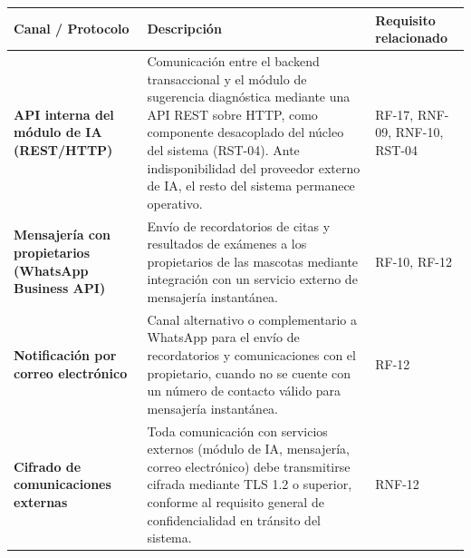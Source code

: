 \documentclass[
]{article}
\newcounter{none} %
\begin{document}
{\def\LTcaptype{none} %
\begin{longtable}[]{|
  >{\raggedright\arraybackslash}p{}|
  >{\raggedright\arraybackslash}p{}|
  >{\raggedright\arraybackslash}p{}|}
\hline
\begin{minipage}[b]{\linewidth}\raggedright
\textbf{Canal / Protocolo}
\end{minipage} & \begin{minipage}[b]{\linewidth}\raggedright
\textbf{Descripción}
\end{minipage} & \begin{minipage}[b]{\linewidth}\raggedright
\textbf{Requisito relacionado}
\end{minipage} \\
\hline
\endhead
\hline
\endlastfoot
\textbf{API interna del módulo de IA (REST/HTTP)} &
\begin{minipage}[t]{\linewidth}\raggedright
Comunicación entre el backend transaccional y el módulo de sugerencia
diagnóstica mediante una API REST sobre HTTP, como componente
desacoplado del núcleo del sistema (RST-04). Ante indisponibilidad del
proveedor externo de IA, el resto del sistema permanece operativo.
\end{minipage} & RF-17, RNF-09, RNF-10, RST-04 \\
\hline
\textbf{Mensajería con propietarios (WhatsApp Business API)} &
\begin{minipage}[t]{\linewidth}\raggedright
Envío de recordatorios de citas y resultados de exámenes a los
propietarios de las mascotas mediante integración con un servicio
externo de mensajería instantánea.
\end{minipage} & RF-10, RF-12 \\
\hline
\textbf{Notificación por correo electrónico} &
\begin{minipage}[t]{\linewidth}\raggedright
Canal alternativo o complementario a WhatsApp para el envío de
recordatorios y comunicaciones con el propietario, cuando no se cuente
con un número de contacto válido para mensajería instantánea.
\end{minipage} & RF-12 \\
\hline
\textbf{Cifrado de comunicaciones externas} &
\begin{minipage}[t]{\linewidth}\raggedright
Toda comunicación con servicios externos (módulo de IA, mensajería,
correo electrónico) debe transmitirse cifrada mediante TLS 1.2 o
superior, conforme al requisito general de confidencialidad en
tránsito del sistema.
\end{minipage} & RNF-12 \\
\hline
\end{longtable}
}
\end{document}
